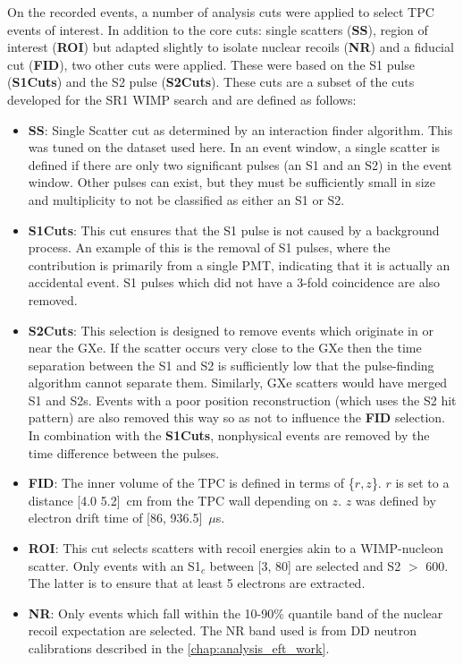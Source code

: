 \par
On the recorded events, a number of analysis cuts were applied to select TPC events of interest.
In addition to the core cuts: single scatters (\textbf{SS}), region of interest (\textbf{ROI}) but adapted slightly to isolate nuclear recoils (\textbf{NR}) and a fiducial cut (\textbf{FID}), two other cuts were applied.
These were based on the S1 pulse (\textbf{S1Cuts}) and the S2 pulse (\textbf{S2Cuts}).
These cuts are a subset of the cuts developed for the SR1 WIMP search \cite{lz_ws_sr1_ref} and are defined as follows:
\begin{itemize}
    \item \textbf{SS}: Single Scatter cut as determined by an interaction finder algorithm. This was tuned on the dataset used here. In an event window, a single scatter is defined if there are only two significant pulses (an S1 and an S2) in the event window. Other pulses can exist, but they must be sufficiently small in size and multiplicity to not be classified as either an S1 or S2.
    \item \textbf{S1Cuts}: This cut ensures that the S1 pulse is not caused by a background process. An example of this is the removal of S1 pulses, where the contribution is primarily from a single PMT, indicating that it is actually an accidental event. S1 pulses which did not have a 3-fold coincidence are also removed.
    \item \textbf{S2Cuts}: This selection is designed to remove events which originate in or near the GXe. If the scatter occurs very close to the GXe then the time separation between the S1 and S2 is sufficiently low that the pulse-finding algorithm cannot separate them. Similarly, GXe scatters would have merged S1 and S2s. Events with a poor position reconstruction (which uses the S2 hit pattern) are also removed this way so as not to influence the \textbf{FID} selection. In combination with the \textbf{S1Cuts}, nonphysical events are removed by the time difference between the pulses.
    \item \textbf{FID}: The inner volume of the TPC is defined in terms of \{$r,z$\}. $r$ is set to a distance [4.0 5.2]~cm from the TPC wall depending on $z$. $z$ was defined by electron drift time of [86, 936.5]~$\mu$s.
    \item \textbf{ROI}: This cut selects scatters with recoil energies akin to a WIMP-nucleon scatter. Only events with an S1$_c$ between [3, 80] are selected and S2 $>$ 600. The latter is to ensure that at least 5 electrons are extracted.
    \item \textbf{NR}: Only events which fall within the 10-90\% quantile band of the nuclear recoil expectation are selected. The NR band used is from DD neutron calibrations described in the \autoref{chap:analysis_eft_work}.
\end{itemize}
